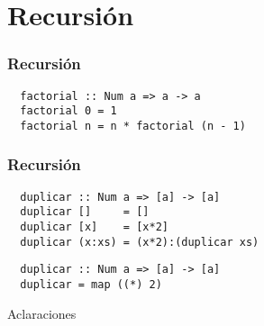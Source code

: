 \section{Recursión}
\begin{frame}[fragile]
  \frametitle{Recursión}
  {\color{white}
    \begin{verbatim}
  factorial :: Num a => a -> a
  factorial 0 = 1
  factorial n = n * factorial (n - 1)
    \end{verbatim}
  }
\end{frame}

\begin{frame}[fragile]
  \frametitle{Recursión}
  {\color{white}
    \begin{verbatim}
  duplicar :: Num a => [a] -> [a]
  duplicar []     = []
  duplicar [x]    = [x*2]
  duplicar (x:xs) = (x*2):(duplicar xs)
    \end{verbatim}
  }
  {\color{white}
    \begin{verbatim}
  duplicar :: Num a => [a] -> [a]
  duplicar = map ((*) 2)
    \end{verbatim}
  }
\end{frame}

\begin{frame}{Aclaraciones}

\end{frame}